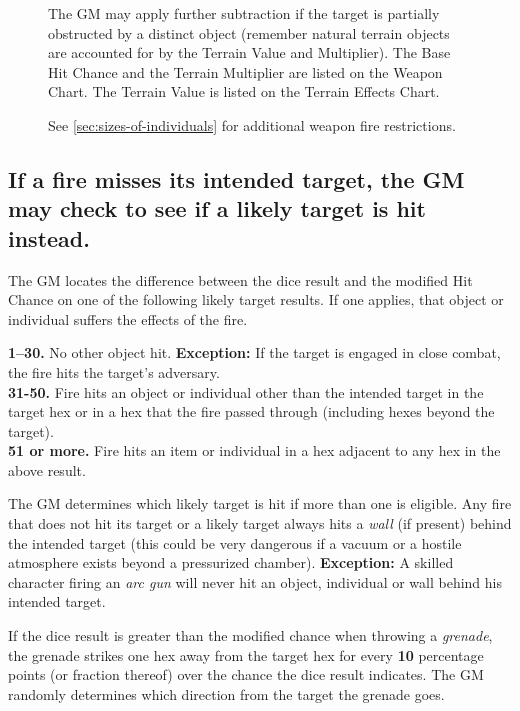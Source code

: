 \begin{figure}[htbp]
{\begin{minipage}{0.95\textwidth}
      \medskip
      
      The GM may apply further subtraction if the target is partially
      obstructed by a distinct object (remember natural terrain
      objects are accounted for by the Terrain Value and Multiplier).
      The Base Hit Chance and the Terrain Multiplier are listed on the
      Weapon Chart. The Terrain Value is listed on the Terrain Effects
      Chart.

      See \ref{sec:sizes-of-individuals} for additional weapon fire
      restrictions.  

      \medskip
    \end{minipage}}
\end{figure}

\subsection[Misses]{If a fire misses its intended target, the GM may check to
  see if a likely target is hit instead.}
\label{sec:misses}



The GM locates the difference between the dice result and the modified
Hit Chance on one of the following likely target results. If one
applies, that object or individual suffers the effects of the fire.

\textbf{1--30.} No other object hit. \textbf{Exception:} If the target
is engaged in close combat, the fire hits the target's adversary.\\
\textbf{31-50.} Fire hits an object or individual other than the
intended target in the target hex or in a hex that the fire passed
through (including
hexes beyond the target). \\
\textbf{51 or more.} Fire hits an item or individual in a hex adjacent
to any hex in the above result.

The GM determines which likely target is hit if more than one is
eligible. Any fire that does not hit its target or a likely target
always hits a \emph{wall} (if present) behind the intended target
(this could be very dangerous if a vacuum or a hostile atmosphere
exists beyond a pressurized chamber). \textbf{Exception:} A skilled
character firing an \emph{arc gun} will never hit an object,
individual or wall behind his intended target.

If the dice result is greater than the modified chance when throwing a
\emph{grenade}, the grenade strikes one hex away from the target hex
for every \textbf{10} percentage points (or fraction thereof) over the
chance the dice result indicates. The GM randomly determines which
direction from the target the grenade goes.

